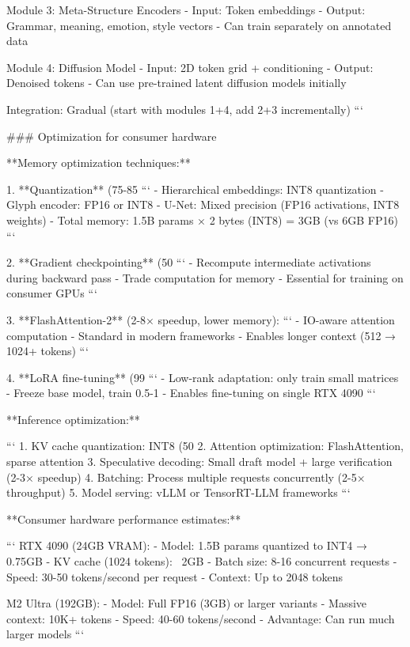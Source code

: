 \documentclass[11pt]{article}
\begin{document}
Module 3: Meta-Structure Encoders
- Input: Token embeddings
- Output: Grammar, meaning, emotion, style vectors
- Can train separately on annotated data

Module 4: Diffusion Model
- Input: 2D token grid + conditioning
- Output: Denoised tokens
- Can use pre-trained latent diffusion models initially

Integration: Gradual (start with modules 1+4, add 2+3 incrementally)
```

### Optimization for consumer hardware

**Memory optimization techniques:**

1. **Quantization** (75-85%
```
- Hierarchical embeddings: INT8 quantization
- Glyph encoder: FP16 or INT8
- U-Net: Mixed precision (FP16 activations, INT8 weights)
- Total memory: 1.5B params × 2 bytes (INT8) = 3GB (vs 6GB FP16)
```

2. **Gradient checkpointing** (50%
```
- Recompute intermediate activations during backward pass
- Trade computation for memory
- Essential for training on consumer GPUs
```

3. **FlashAttention-2** (2-8× speedup, lower memory):
```
- IO-aware attention computation
- Standard in modern frameworks
- Enables longer context (512 → 1024+ tokens)
```

4. **LoRA fine-tuning** (99%
```
- Low-rank adaptation: only train small matrices
- Freeze base model, train 0.5-1%
- Enables fine-tuning on single RTX 4090
```

**Inference optimization:**

```
1. KV cache quantization: INT8 (50%
2. Attention optimization: FlashAttention, sparse attention
3. Speculative decoding: Small draft model + large verification (2-3× speedup)
4. Batching: Process multiple requests concurrently (2-5× throughput)
5. Model serving: vLLM or TensorRT-LLM frameworks
```

**Consumer hardware performance estimates:**

```
RTX 4090 (24GB VRAM):
- Model: 1.5B params quantized to INT4 → 0.75GB
- KV cache (1024 tokens): ~2GB
- Batch size: 8-16 concurrent requests
- Speed: 30-50 tokens/second per request
- Context: Up to 2048 tokens

M2 Ultra (192GB):
- Model: Full FP16 (3GB) or larger variants
- Massive context: 10K+ tokens
- Speed: 40-60 tokens/second
- Advantage: Can run much larger models
```
\end{document}
